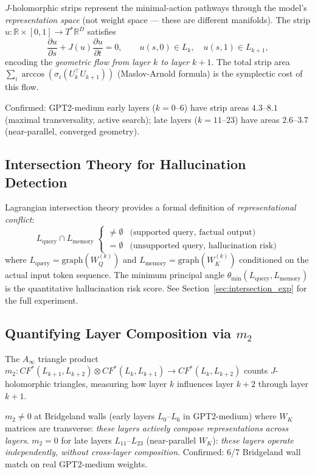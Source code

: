 \documentclass[11pt]{amsart}
\begin{document}
$J$-holomorphic strips represent the minimal-action pathways through
the model's \emph{representation space}
(not weight space — these are different manifolds).
The strip $u: \mathbb{R}\times[0,1] \to T^*\mathbb{R}^D$ satisfies
\[
  \frac{\partial u}{\partial s} + J(u)\frac{\partial u}{\partial t} = 0,
  \qquad u(s,0)\in L_k,\quad u(s,1)\in L_{k+1},
\]
encoding the \emph{geometric flow from layer $k$ to layer $k+1$}.
The total strip area $\sum_i \arccos(\sigma_i(U_k^\top U_{k+1}))$
(Maslov-Arnold formula) is the symplectic cost of this flow.

Confirmed: GPT2-medium early layers ($k=0$--$6$) have strip areas
$4.3$--$8.1$ (maximal transversality, active search);
late layers ($k=11$--$23$) have areas $2.6$--$3.7$
(near-parallel, converged geometry).

\subsection{Intersection Theory for Hallucination Detection}

Lagrangian intersection theory provides a formal definition of
\emph{representational conflict}:
\[
  L_\text{query} \cap L_\text{memory} \;
  \begin{cases} \neq \emptyset & \text{(supported query, factual output)} \\
  = \emptyset & \text{(unsupported query, hallucination risk)} \end{cases}
\]
where $L_\text{query} = \mathrm{graph}(W_Q^{(k)})$ and
$L_\text{memory} = \mathrm{graph}(W_K^{(k)})$ conditioned on
the actual input token sequence.
The minimum principal angle $\theta_\mathrm{min}(L_\text{query}, L_\text{memory})$
is the quantitative hallucination risk score.
See Section~\ref{sec:intersection_exp} for the full experiment.

\subsection{Quantifying Layer Composition via $m_2$}

The $A_\infty$ triangle product
$m_2: CF^{*}(L_{k+1},L_{k+2})\otimes CF^{*}(L_k,L_{k+1}) \to CF^{*}(L_k,L_{k+2})$
counts $J$-holomorphic triangles, measuring how layer $k$ influences
layer $k+2$ through layer $k+1$.

$m_2 \neq 0$ at Bridgeland walls (early layers $L_0$--$L_6$ in GPT2-medium)
where $W_K$ matrices are transverse: \emph{these layers actively compose
representations across layers}.
$m_2 = 0$ for late layers $L_{11}$--$L_{23}$ (near-parallel $W_K$):
\emph{these layers operate independently, without cross-layer composition}.
Confirmed: 6/7 Bridgeland wall match on real GPT2-medium weights.
\end{document}
